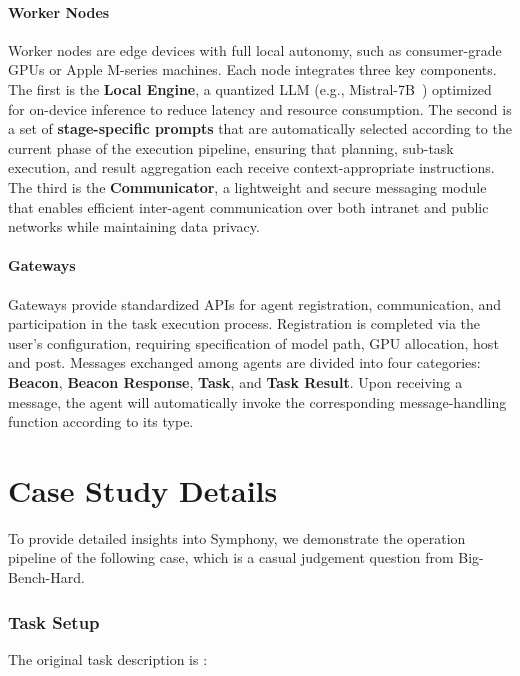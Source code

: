 \documentclass{article}
\begin{document}
\paragraph{Worker Nodes}
Worker nodes are edge devices with full local autonomy, such as consumer-grade GPUs or Apple M-series machines. Each node integrates three key components. The first is the \textbf{Local Engine}, a quantized LLM (e.g., Mistral-7B~\cite{mistral7binstructv03}) optimized for on-device inference to reduce latency and resource consumption. The second is a set of \textbf{stage-specific prompts} that are automatically selected according to the current phase of the execution pipeline, ensuring that planning, sub-task execution, and result aggregation each receive context-appropriate instructions. The third is the \textbf{Communicator}, a lightweight and secure messaging module that enables efficient inter-agent communication over both intranet and public networks while maintaining data privacy.

\paragraph{Gateways}
Gateways provide standardized APIs for agent registration, communication, and participation in the task execution process. Registration is completed via the user's configuration, requiring specification of model path, GPU allocation, host and post. Messages exchanged among agents are divided into four categories: \textbf{Beacon}, \textbf{Beacon Response}, \textbf{Task}, and \textbf{Task Result}. Upon receiving a message, the agent will automatically invoke the corresponding message-handling function according to its type.

\section{Case Study Details}
\label{app:case_study}

To provide detailed insights into Symphony, we demonstrate the operation pipeline of the following case, which is a casual judgement question from Big-Bench-Hard.

\subsubsection{Task Setup} 
The original task description is : 
\end{document}
